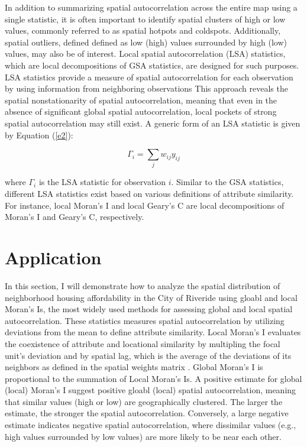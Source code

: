 \documentclass[
]{aft}
\begin{document}
In addition to summarizing spatial autocorrelation across the entire map
using a single statistic, it is often important to identify spatial
clusters of high or low values, commonly referred to as spatial hotpots
and coldspots. Additionally, spatial outliers, defined defined as low
(high) values surrounded by high (low) values, may also be of interest.
Local spatial autocorrelation (LSA) statistics, which are local
decompositions of GSA statistics, are designed for such purposes. LSA
statistics provide a measure of spatial autocorrelation for each
observation by using information from neighboring observations This
approach reveals the spatial nonstationarity of spatial autocorrelation,
meaning that even in the absence of significant global spatial
autocorrelation, local pockets of strong spatial autocorrelation may
still exist. A generic form of an LSA statistic is given by Equation
(\ref{e2}):

\begin{equation}
\label{e2}
\Gamma_i = \sum_j w_{ij} y_{ij}
\end{equation}

where \(\Gamma_i\) is the LSA statistic for observation \(i\). Similar
to the GSA statistics, different LSA statistics exist based on various
definitions of attribute similarity. For instance, local Moran's I and
local Geary's C are local decompositions of Moran's I and Geary's C,
respectively\citep{Anselin:1995fn}.

\section{Application}\label{sec-app}

In this section, I will demonstrate how to analyze the spatial
distribution of neighborhood housing affordability in the City of
Riveride using gloabl and local Moran's Is, the most widely used methods
for assessing global and local spatial autocorrelation. These statistics
measures spatial autocorrelation by utilizing deviations from the mean
to define attribute similarity. Local Moran's I evaluates the
coexistence of attribute and locational similarity by multipling the
focal unit's deviation and by spatial lag, which is the average of the
deviations of its neighbors as defined in the spatial weights matrix
\citep{Anselin:1995fn}. Global Moran's I is proportional to the
summation of Local Moran's Is. A positive estimate for global (local)
Moran's I suggest positive gloabl (local) spatial autocorrelation,
meaning that similar values (high or low) are geographically clustered.
The larger the estimate, the stronger the spatial autocorrelation.
Conversely, a large negative estimate indicates negative spatial
autocorrelation, where dissimilar values (e.g., high values surrounded
by low values) are more likely to be near each other.
\end{document}
